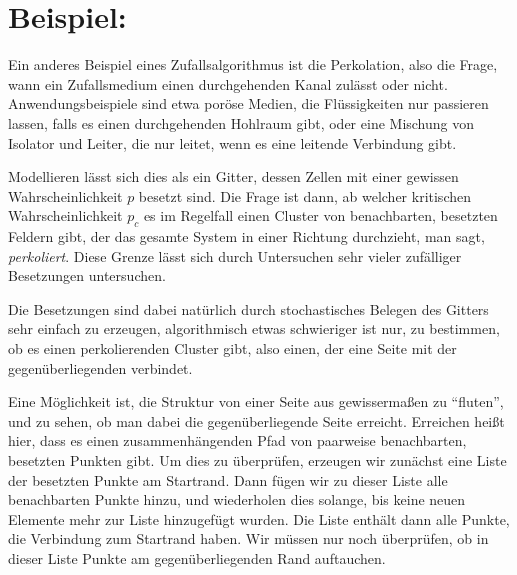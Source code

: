 \raggedbottom 

\section{Beispiel: }

Ein anderes Beispiel eines Zufallsalgorithmus ist die Perkolation,
also die Frage, wann ein Zufallsmedium einen durchgehenden Kanal
zulässt oder nicht. Anwendungsbeispiele sind etwa poröse Medien, die
Flüssigkeiten nur passieren lassen, falls es einen durchgehenden
Hohlraum gibt, oder eine Mischung von Isolator und Leiter, die nur
leitet, wenn es eine leitende Verbindung gibt.

Modellieren lässt sich dies als ein Gitter, dessen Zellen mit einer
gewissen Wahrscheinlichkeit $p$ besetzt sind. Die Frage ist dann, ab
welcher kritischen Wahrscheinlichkeit $p_c$ es im Regelfall einen
Cluster von benachbarten, besetzten Feldern gibt, der das gesamte
System in einer Richtung durchzieht, man sagt,
\emph{perkoliert}. Diese Grenze lässt sich durch Untersuchen sehr
vieler zufälliger Besetzungen untersuchen.

Die Besetzungen sind dabei natürlich durch stochastisches Belegen des
Gitters sehr einfach zu erzeugen, algorithmisch etwas schwieriger ist
nur, zu bestimmen, ob es einen perkolierenden Cluster gibt, also
einen, der eine Seite mit der gegenüberliegenden verbindet.

Eine Möglichkeit ist, die Struktur von einer Seite aus gewissermaßen
zu "`fluten"', und zu sehen, ob man dabei die gegenüberliegende Seite
erreicht. Erreichen heißt hier, dass es einen zusammenhängenden Pfad
von paarweise benachbarten, besetzten Punkten gibt. Um dies zu
überprüfen, erzeugen wir zunächst eine Liste der besetzten Punkte am
Start\-rand.  Dann fügen wir zu dieser Liste alle benachbarten Punkte
hinzu, und wiederholen dies solange, bis keine neuen Elemente mehr zur
Liste hinzugefügt wurden. Die Liste enthält dann alle Punkte, die
Verbindung zum Startrand haben. Wir müssen nur noch überprüfen, ob in
dieser Liste Punkte am gegenüberliegenden Rand auftauchen.

